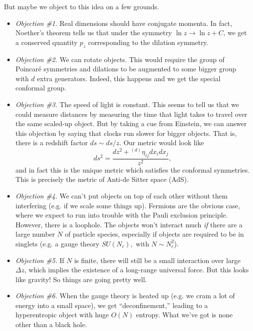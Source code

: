 But maybe we object to this idea on a few grounds.
\begin{itemize}
    \item \emph{Objection \#1.} Real dimensions should have conjugate momenta. In fact, Noether's theorem tells us that under the symmetry $\ln z \to \ln z + C$, we get a conserved quantity $p_z$ corresponding to the dilation symmetry.
    \item \emph{Objection \#2.} We can rotate objects. This would require the group of Poincar\'e symmetries and dilations to be augmented to some bigger group with $d$ extra generators. Indeed, this happens and we get the special conformal group.
    \item \emph{Objection \#3.} The speed of light is constant. This seems to tell us that we could measure distances by measuring the time that light takes to travel over the same scaled-up object. But by taking a cue from Einstein, we can answer this objection by saying that clocks run slower for bigger objects. That is, there is a redshift factor $ds\sim ds/z$. Our metric would look like
    \begin{equation}
        ds^2 = \frac{dz^2 + {}^{(d)} \eta_{ij} dx_i dx_j}{z^2},
    \end{equation}
    and in fact this is the unique metric which satisfies the conformal symmetries. This is precisely the metric of Anti-de Sitter space (AdS).
    \item \emph{Objection \#4.} We can't put objects on top of each other without them interfering (e.g. if we scale some things up). Fermions are the obvious case, where we expect to run into trouble with the Pauli exclusion principle. However, there is a loophole. The objects won't interact much \emph{if} there are a large number $N$ of particle species, especially if objects are required to be in singlets (e.g. a gauge theory $SU(N_c),$ with $N\sim N_c^2$).
    \item \emph{Objection \#5.} If $N$ is finite, there will still be a small interaction over large $\Delta z$, which implies the existence of a long-range universal force. But this looks like gravity! So things are going pretty well.
    \item \emph{Objection \#6.} When the gauge theory is heated up (e.g. we cram a lot of energy into a small space), we get ``deconfinement,'' leading to a hyperentropic object with huge $O(N)$ entropy. What we've got is none other than a black hole.
\end{itemize}

